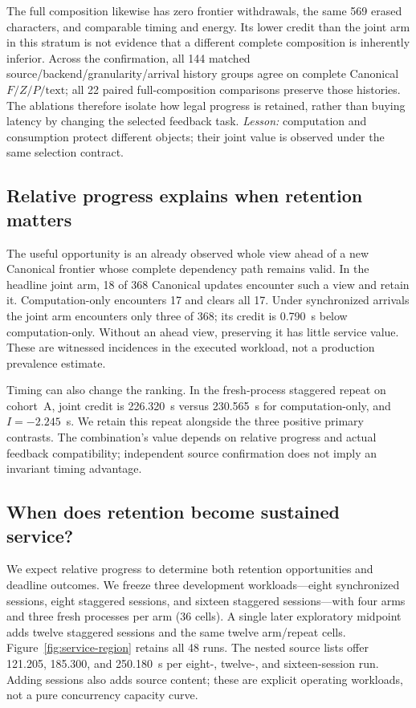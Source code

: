 The full composition likewise has zero frontier withdrawals, the same 569
erased characters, and comparable timing and energy. Its lower credit
than the joint arm in this stratum is not evidence that a different
complete composition is inherently inferior. Across the confirmation,
all 144 matched source/backend/granularity/arrival history groups agree
on complete Canonical $F/Z/P/\mathrm{text}$; all 22 paired full-composition
comparisons preserve those histories. The ablations therefore isolate
how legal progress is retained, rather than buying latency by changing
the selected feedback task.
\emph{Lesson:} computation and consumption protect different objects;
their joint value is observed under the same selection contract.

\subsection{Relative progress explains when retention matters}
The useful opportunity is an already observed whole view ahead of a
new Canonical frontier whose complete dependency path remains valid.
In the headline joint arm, 18 of 368 Canonical updates encounter such
a view and retain it. Computation-only encounters 17 and clears all 17.
Under synchronized arrivals the joint arm encounters only three of
368; its credit is 0.790~s below computation-only. Without an ahead
view, preserving it has little service value. These are witnessed
incidences in the executed workload, not a production prevalence estimate.

Timing can also change the ranking. In the fresh-process staggered
repeat on cohort~A, joint credit is 226.320~s versus 230.565~s for
computation-only, and $I=-2.245$~s. We retain this repeat alongside
the three positive primary contrasts. The combination's value depends
on relative progress and actual feedback compatibility; independent
source confirmation does not imply an invariant timing advantage.

\subsection{When does retention become sustained service?}
We expect relative progress to determine both retention opportunities and
deadline outcomes. We freeze three development workloads---eight synchronized
sessions, eight staggered sessions, and sixteen staggered sessions---with
four arms and three fresh processes per arm (36 cells). A single later
exploratory midpoint adds twelve staggered sessions and the same twelve
arm/repeat cells. Figure~\ref{fig:service-region} retains all 48 runs.
The nested source lists offer 121.205, 185.300, and 250.180~s per
eight-, twelve-, and sixteen-session run. Adding sessions also adds
source content; these are explicit operating workloads, not a pure
concurrency capacity curve.

